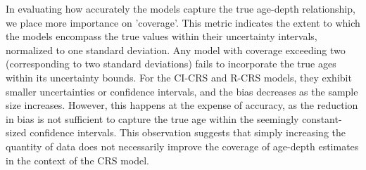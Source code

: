 \documentclass [10pt] {article}
\begin{document}
In evaluating how accurately the models capture the true age-depth relationship, we place more importance on 'coverage'. This metric indicates the extent to which the models encompass the true values within their uncertainty intervals, normalized to one standard deviation. Any model with coverage exceeding two (corresponding to two standard deviations) fails to incorporate the true ages within its uncertainty bounds. For the CI-CRS and R-CRS models, they exhibit smaller uncertainties or confidence intervals, and the bias decreases as the sample size increases. However, this happens at the expense of accuracy, as the reduction in bias is not sufficient to capture the true age within the seemingly constant-sized confidence intervals.
This observation suggests that simply increasing the quantity of data does not necessarily improve the coverage of age-depth estimates in the context of the CRS model.

\end{document}
